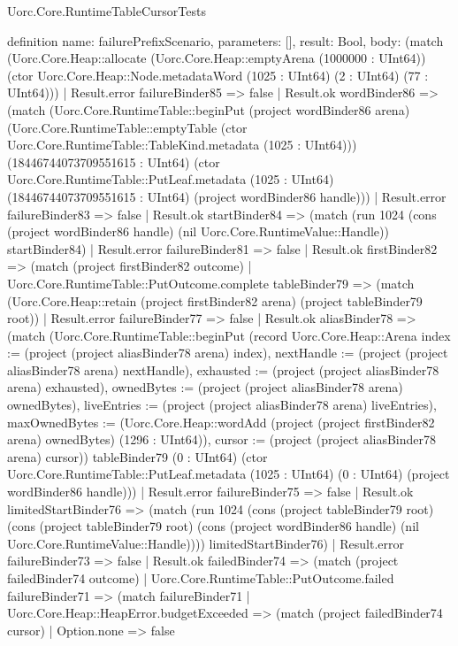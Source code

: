 \begin{lexlean}{Uorc.Core.RuntimeTableCursorTests}
\begin{semanticmodule}
definition{
  name: failurePrefixScenario,
  parameters: [],
  result: Bool,
  body: (match (Uorc.Core.Heap::allocate (Uorc.Core.Heap::emptyArena (1000000 : UInt64)) (ctor Uorc.Core.Heap::Node.metadataWord (1025 : UInt64) (2 : UInt64) (77 : UInt64)))
    | Result.error failureBinder85 => false
    | Result.ok wordBinder86 => (match (Uorc.Core.RuntimeTable::beginPut (project wordBinder86 arena) (Uorc.Core.RuntimeTable::emptyTable (ctor Uorc.Core.RuntimeTable::TableKind.metadata (1025 : UInt64))) (18446744073709551615 : UInt64) (ctor Uorc.Core.RuntimeTable::PutLeaf.metadata (1025 : UInt64) (18446744073709551615 : UInt64) (project wordBinder86 handle)))
      | Result.error failureBinder83 => false
      | Result.ok startBinder84 => (match (run 1024 (cons (project wordBinder86 handle) (nil Uorc.Core.RuntimeValue::Handle)) startBinder84)
        | Result.error failureBinder81 => false
        | Result.ok firstBinder82 => (match (project firstBinder82 outcome)
          | Uorc.Core.RuntimeTable::PutOutcome.complete tableBinder79 => (match (Uorc.Core.Heap::retain (project firstBinder82 arena) (project tableBinder79 root))
            | Result.error failureBinder77 => false
            | Result.ok aliasBinder78 => (match (Uorc.Core.RuntimeTable::beginPut (record Uorc.Core.Heap::Arena {index := (project (project aliasBinder78 arena) index), nextHandle := (project (project aliasBinder78 arena) nextHandle), exhausted := (project (project aliasBinder78 arena) exhausted), ownedBytes := (project (project aliasBinder78 arena) ownedBytes), liveEntries := (project (project aliasBinder78 arena) liveEntries), maxOwnedBytes := (Uorc.Core.Heap::wordAdd (project (project firstBinder82 arena) ownedBytes) (1296 : UInt64)), cursor := (project (project aliasBinder78 arena) cursor)}) tableBinder79 (0 : UInt64) (ctor Uorc.Core.RuntimeTable::PutLeaf.metadata (1025 : UInt64) (0 : UInt64) (project wordBinder86 handle)))
              | Result.error failureBinder75 => false
              | Result.ok limitedStartBinder76 => (match (run 1024 (cons (project tableBinder79 root) (cons (project tableBinder79 root) (cons (project wordBinder86 handle) (nil Uorc.Core.RuntimeValue::Handle)))) limitedStartBinder76)
                | Result.error failureBinder73 => false
                | Result.ok failedBinder74 => (match (project failedBinder74 outcome)
                  | Uorc.Core.RuntimeTable::PutOutcome.failed failureBinder71 => (match failureBinder71
                    | Uorc.Core.Heap::HeapError.budgetExceeded => (match (project failedBinder74 cursor)
                      | Option.none => false
}
\end{semanticmodule}
\end{lexlean}
